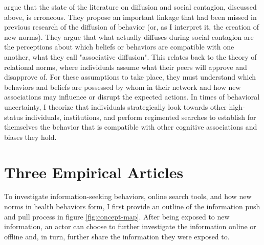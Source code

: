 \citet{goldbergSocialContagionAssociative2018} argue that the state of the
literature on diffusion and social contagion, discussed above, is erroneous.
They propose an important linkage that had been missed in previous research of
the diffusion of behavior (or, as I interpret it, the creation of new norms).
They argue that what actually diffuses during social contagion are the
perceptions about which beliefs or behaviors are compatible with one another,
what they call "associative diffusion". 
This relates back to the theory of relational norms, where individuals assume
what their peers will approve and disapprove of. For these assumptions 
to take place, they must understand which behaviors and beliefs
are possessed by whom in their network and how new associations may influence
or disrupt the expected actions. In times of behavioral uncertainty, I
theorize that individuals strategically look towards other high-status
individuals, institutions, and perform regimented searches to establish for
themselves the behavior that is compatible with other cognitive associations
and biases they hold.

\section{Three Empirical Articles}

To investigate information-seeking behaviors, online search tools, and how
new norms in health behaviors form, I first provide an outline of the 
information push and pull process in figure \ref{fig:concept-map}. After 
being exposed to new information, an actor can choose to further investigate
the information online or offline and, in turn, further share the 
information they were exposed to. 

